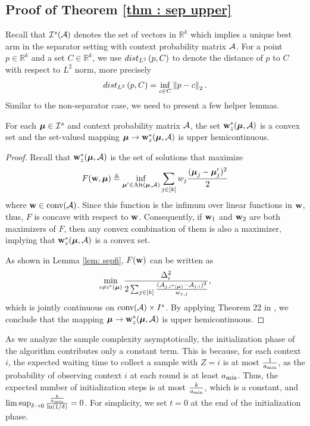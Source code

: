 \subsection{Proof of Theorem \ref{thm : sep upper}}
    Recall that $\mathcal{I}^s(\mathcal{A})$ denotes the set of vectors in $\mathbb{R}^k$ which implies a unique best arm in the separator setting with context probability matrix $\mathcal{A}$. For a point $p \in \mathbb{R}^k$ and a set $C \in \mathbb{R}^k$, we use $dist_{L^2}\left(p, C\right)$ to denote the distance of $p$ to $C$ with respect to $L^2$ norm, more precisely 
    \begin{align*}
        dist_{L^2}\left(p, C\right) = \inf_{c \in C} \left\Vert p - c \right\Vert _{2}.
    \end{align*}
    Similar to the non-separator case, we need to present a few helper lemmas. 

    \begin{lemma} \label{lem: sep continuouity}
        For each $\boldsymbol{\mu} \in \mathcal{I}^s$ and context probability matrix $\mathcal{A}$, the set $\mathbf{w}_z^*(\boldsymbol{\mu}, \mathcal{A})$ is a convex set and the set-valued mapping $\boldsymbol{\mu} \rightarrow \mathbf{w}_z^*(\boldsymbol{\mu}, \mathcal{A})$ is upper hemicontinuous. 
    \end{lemma}
    \begin{proof}
        Recall that $\mathbf{w}_z^*(\boldsymbol{\mu}, \mathcal{A})$ is the set of solutions that maximize
        \begin{align*}
          F(\mathbf{w}, \boldsymbol{\mu}) \triangleq \inf_{\boldsymbol{\mu}' \in \text{Alt}(\boldsymbol{\mu}, \mathcal{A})} \sum_{j \in [k]} w_j \frac{(\boldsymbol{\mu}_{j} - \boldsymbol{\mu}'_{j})^2}{2}
        \end{align*}
        where $\mathbf{w} \in \text{conv}(\mathcal{A})$. Since this function is the infimum over linear functions in $\mathbf{w}$, thus, $F$ is concave with respect to $\mathbf{w}$. Consequently, if $\mathbf{w}_1$ and $\mathbf{w}_2$ are both maximizers of $F$, then any convex combination of them is also a maximizer, implying that $\mathbf{w}_z^*(\boldsymbol{\mu}, \mathcal{A})$ is a convex set. 
        
        As shown in Lemma \ref{lem: sepfi}, $F(\mathbf{w})$ can be written as  
        \begin{align*}
             \min_{i \neq i^*(\boldsymbol{\mu})} \frac{\Delta_{i}^2}{2 \sum_{j \in [k]} \frac{(\mathcal{A}_{j, i^*(\boldsymbol{\mu})} - \mathcal{A}_{j, i})^2}{w_{z,j}}},
        \end{align*}
        which is jointly continuous on $\text{conv}(\mathcal{A}) \times I^{s}$. By applying Theorem 22 in \cite{mutiple-correct-answers-degenne2019pure}, we conclude that the mapping $\boldsymbol{\mu} \rightarrow \mathbf{w}_z^*(\boldsymbol{\mu}, \mathcal{A})$ is upper hemicontinuous.
    \end{proof}

    As we analyze the sample complexity asymptotically, the initialization phase of the algorithm contributes only a constant term. This is because, for each context $i$, the expected waiting time to collect a sample with $Z = i$ is at most $\frac{1}{a_{\min}}$, as the probability of observing context $i$ at each round is at least $a_{\min}$. Thus, the expected number of initialization steps is at most $\frac{k}{a_{\min}}$, which is a constant, and $\limsup_{\delta \rightarrow 0} \frac{\frac{k}{a_{\min}}}{\ln(1 / \delta)} = 0$. For simplicity, we set $t=0$ at the end of the initialization phase.


